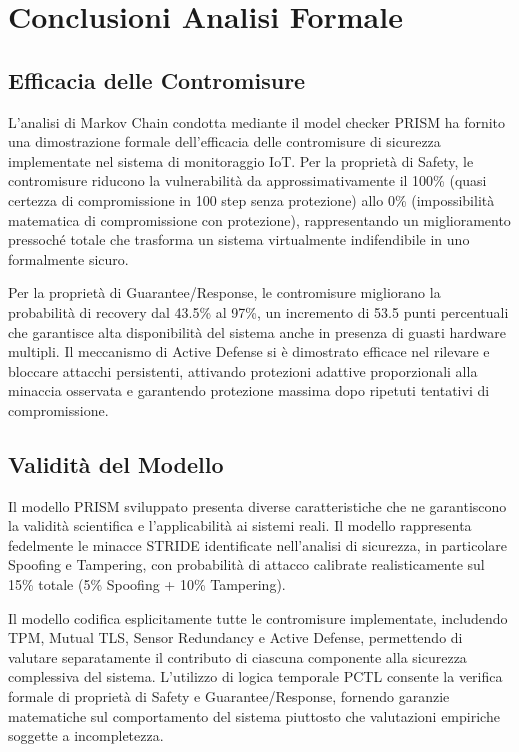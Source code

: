 \section{Conclusioni Analisi Formale}

\subsection{Efficacia delle Contromisure}
L'analisi di Markov Chain condotta mediante il model checker PRISM ha fornito una dimostrazione formale dell'efficacia delle contromisure di sicurezza implementate nel sistema di monitoraggio IoT. Per la proprietà di Safety, le contromisure riducono la vulnerabilità da approssimativamente il 100\% (quasi certezza di compromissione in 100 step senza protezione) allo 0\% (impossibilità matematica di compromissione con protezione), rappresentando un miglioramento pressoché totale che trasforma un sistema virtualmente indifendibile in uno formalmente sicuro.

Per la proprietà di Guarantee/Response, le contromisure migliorano la probabilità di recovery dal 43.5\% al 97\%, un incremento di 53.5 punti percentuali che garantisce alta disponibilità del sistema anche in presenza di guasti hardware multipli. Il meccanismo di Active Defense si è dimostrato efficace nel rilevare e bloccare attacchi persistenti, attivando protezioni adattive proporzionali alla minaccia osservata e garantendo protezione massima dopo ripetuti tentativi di compromissione.

\subsection{Validità del Modello}
Il modello PRISM sviluppato presenta diverse caratteristiche che ne garantiscono la validità scientifica e l'applicabilità ai sistemi reali. Il modello rappresenta fedelmente le minacce STRIDE identificate nell'analisi di sicurezza, in particolare Spoofing e Tampering, con probabilità di attacco calibrate realisticamente sul 15\% totale (5\% Spoofing + 10\% Tampering).

Il modello codifica esplicitamente tutte le contromisure implementate, includendo TPM, Mutual TLS, Sensor Redundancy e Active Defense, permettendo di valutare separatamente il contributo di ciascuna componente alla sicurezza complessiva del sistema. L'utilizzo di logica temporale PCTL consente la verifica formale di proprietà di Safety e Guarantee/Response, fornendo garanzie matematiche sul comportamento del sistema piuttosto che valutazioni empiriche soggette a incompletezza.

